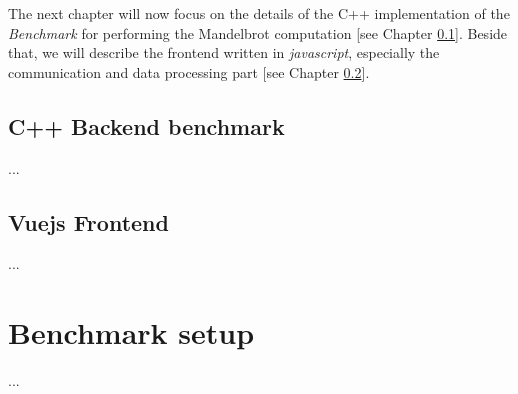\noindent The next chapter will now focus on the details of the C++ implementation of the \textit{Benchmark} for performing the Mandelbrot computation [see Chapter \ref{subsection:backend}]. Beside that, we will describe the frontend written in \textit{javascript}, especially the communication and data processing part [see Chapter \ref{subsection:frontend}]. 

\newpage

\subsection{C++ Backend benchmark} \label{subsection:backend}

...

\subsection{Vuejs Frontend} \label{subsection:frontend}

...\newpage

\section{Benchmark setup}

...
